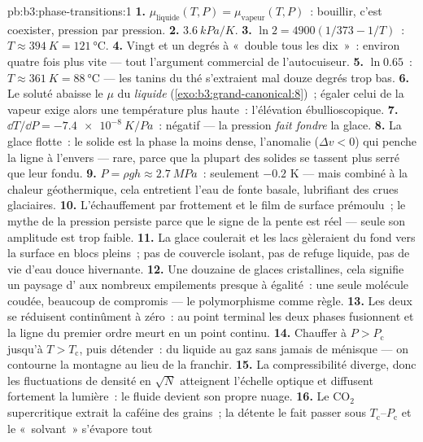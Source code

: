 \begin{solution}{pb:b3:phase-transitions:1}
\textbf{1.} $\mu_{\text{liquide}}(T, P) = \mu_{\text{vapeur}}(T,
P)$~: bouillir, c'est coexister, pression par pression.
\textbf{2.} $\qty{3.6}{kPa/K}$.
\textbf{3.} $\ln2 = 4900(1/373 - 1/T)$~: $T \approx \qty{394}{K} =
\qty{121}{\celsius}$.
\textbf{4.} Vingt et un degrés à «~double tous les dix~»~: environ
quatre fois plus vite --- tout l'argument commercial de
l'autocuiseur.
\textbf{5.} $\ln0.65$~: $T \approx \qty{361}{K} =
\qty{88}{\celsius}$ --- les tanins du thé s'extraient mal douze
degrés trop bas.
\textbf{6.} Le soluté abaisse le $\mu$ du \emph{liquide}
(\cref{exo:b3:grand-canonical:8})~; égaler celui de la vapeur exige
alors une température plus haute~: l'élévation ébullioscopique.
\textbf{7.} $\dd T/\dd P = \qty{-7.4e-8}{K/Pa}$~: négatif --- la
pression \emph{fait fondre} la glace.
\textbf{8.} La glace flotte~: le solide est la phase la moins
dense, l'anomalie ($\Delta v < 0$) qui penche la ligne à l'envers
--- rare, parce que la plupart des solides se tassent plus serré
que leur fondu.
\textbf{9.} $P = \rho gh \approx \qty{2.7}{MPa}$~: seulement
$-0.2$ K --- mais combiné à la chaleur géothermique, cela entretient
l'eau de fonte basale, lubrifiant des crues glaciaires.
\textbf{10.} L'échauffement par frottement et le film de surface
prémoulu~; le mythe de la pression persiste parce que le signe de
la pente est réel --- seule son amplitude est trop faible.
\textbf{11.} La glace coulerait et les lacs gèleraient du fond
vers la surface en blocs pleins~; pas de couvercle isolant, pas de
refuge liquide, pas de vie d'eau douce hivernante.
\textbf{12.} Une douzaine de glaces cristallines, cela signifie un
paysage d' aux nombreux empilements presque à
égalité~: une seule molécule coudée, beaucoup de compromis --- le
polymorphisme comme règle.
\textbf{13.} Les deux se réduisent continûment à zéro~: au point
terminal les deux phases fusionnent et la ligne du premier ordre
meurt en un point continu.
\textbf{14.} Chauffer à $P > P_{\text{c}}$ jusqu'à
$T > T_{\text{c}}$, puis détender~: du liquide au gaz sans jamais
de ménisque --- on contourne la montagne au lieu de la franchir.
\textbf{15.} La compressibilité diverge, donc les fluctuations de
densité en $\sqrt N$ atteignent l'échelle optique et diffusent
fortement la lumière~: le fluide devient son propre nuage.
\textbf{16.} Le CO$_2$ supercritique extrait la caféine des
grains~; la détente le fait passer sous
$T_{\text{c}}$--$P_{\text{c}}$ et le «~solvant~» s'évapore tout

\end{solution}

